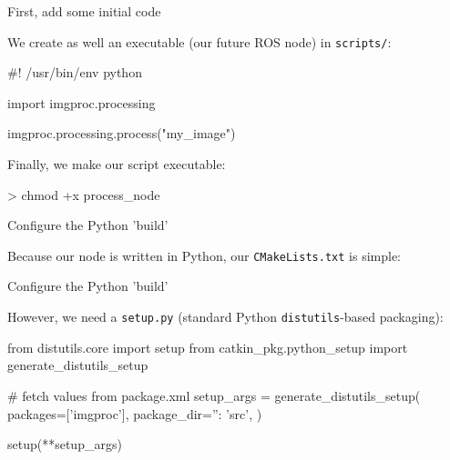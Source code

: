 \documentclass[compress]{beamer}
\begin{document}
\begin{frame}[fragile]{First, add some initial code}

We create as well an executable (our future ROS node) in \texttt{scripts/}:

\pause

\begin{pythoncode}
#! /usr/bin/env python

import imgproc.processing

imgproc.processing.process("my_image")
\end{pythoncode}

\pause

Finally, we make our script executable:
\begin{shcode}
> chmod +x process_node
\end{shcode}
\end{frame}

\begin{frame}[fragile]{Configure the Python 'build'}

Because our node is written in Python, our \texttt{CMakeLists.txt} is simple:

\end{frame}

\begin{frame}[fragile]{Configure the Python 'build'}

However, we need a \texttt{setup.py} (standard Python
    \texttt{distutils}-based packaging):

\begin{pythoncode}
from distutils.core import setup
from catkin_pkg.python_setup import generate_distutils_setup

# fetch values from package.xml
setup_args = generate_distutils_setup(
                    packages=['imgproc'],
                    package_dir={'': 'src'},
                )

setup(**setup_args)
\end{pythoncode}

\end{frame}
\end{document}
